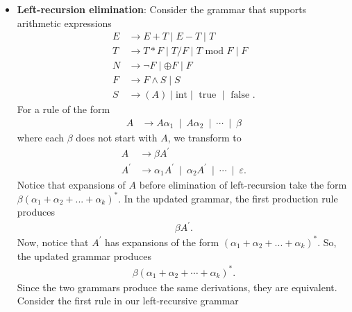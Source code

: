 \documentclass{report}
\begin{document}
\begin{itemize}
\begin{itemize}
                \item \textbf{First L:} scan input Left to right
                \item \textbf{R:} construct a Rightmost derivation in reverse
            \end{itemize}
            They start from the input and reduce it back to the start symbol. These parsers are \textbf{bottom up}
        \item \textbf{Left-recursion elimination}: Consider the grammar that supports arithmetic expressions
            \begin{align*}
                E &\to E + T \mid E - T \mid T\\
                T &\to T * F \mid T / F \mid T \text{ mod } F \mid F\\
                N &\to \neg F \mid \oplus F \mid F\\
                F &\to F \land S \mid S\\
                S &\to (A) \mid \text{int} \mid \text{ true } \mid \text{ false }
            .\end{align*}
            For a rule of the form
            \begin{align*}
                A &\to A\alpha_{1} \ \mid \ A\alpha_{2} \ \mid \ \cdots \ \mid \ \beta
            \end{align*}
            where each $\beta$ does not start with $A$, we transform to
            \begin{align*}
                A &\to \beta A^{\prime} \\
                A^{\prime} &\to \alpha_{1}A^{\prime} \ \mid \ \alpha_{2}A^{\prime} \ \mid \ \cdots \ \mid \ \varepsilon
            .\end{align*}
            Notice that expansions of $A$ before elimination of left-recursion take the form  $\beta(\alpha_{1} + \alpha_{2} + ... + \alpha_{k})^{*}$. In the updated grammar, the first production rule produces
            \begin{align*}
                \beta A^{\prime}
            .\end{align*}
            Now, notice that $A^{\prime}$ has expansions of the form $(\alpha_{1} + \alpha_{2} + ... + \alpha_{k})^{*}$. So, the updated grammar produces
            \begin{align*}
                \beta(\alpha_{1} + \alpha_{2} + \cdots + \alpha_{k})^{*} 
            .\end{align*}
            Since the two grammars produce the same derivations, they are equivalent. Consider the first rule in our left-recursive grammar

\end{itemize}
\end{document}
